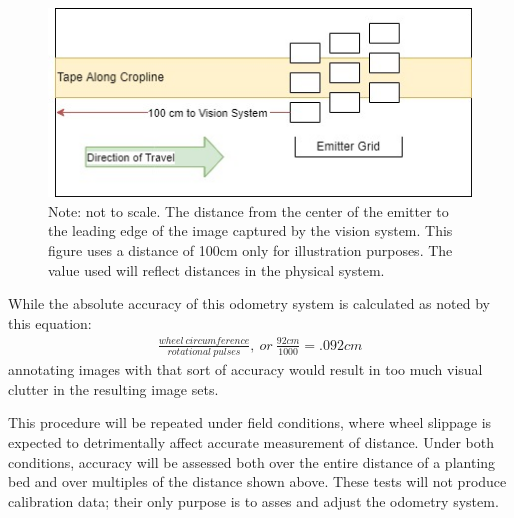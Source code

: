 \documentclass[12pt]{article}
\begin{document}
\begin{figure}[H]
	\centering
	\includegraphics[width=0.75\linewidth]{./figures/test-distance.jpg}
	\caption[Test for distance measurement from emitter]{Note: not to scale. The distance from the center of the emitter to the leading edge of the image captured by the vision system. This figure uses a distance of 100cm only for illustration purposes. The value used will reflect distances in the physical system.}
	\label{fig:test-distance}
\end{figure}

While the absolute accuracy of this odometry system is calculated as noted by this equation:
\begin{align}
\frac {wheel\ circumference}  {rotational\ pulses},\  or\  \frac {92cm} {1000} = .092cm
\end{align}
annotating images with that sort of accuracy would result in too much visual clutter in the resulting image sets.

This procedure will be repeated under field conditions, where wheel slippage is expected to detrimentally affect accurate measurement of distance. Under both conditions, accuracy will be assessed both over the entire distance of a planting bed and over multiples of the distance shown above. These tests will not produce calibration data; their only purpose is to asses and adjust the odometry system.
\end{document}
